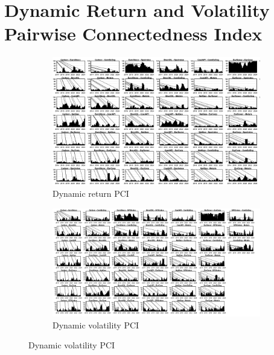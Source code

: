 \documentclass[preprint, 3p,
authoryear]{elsarticle} %
\begin{document}
\section{Dynamic Return and Volatility Pairwise Connectedness Index}
\label{appendix:c}
\begin{figure}[H]
  \caption{Dynamic Return and Volatility Pairwise Connectedness Index (Jan 2013 – Aug 2024)}
  \label{fig:dynPCIfull}
      \begin{subfigure}[H]{\textwidth}
        \centering
        \caption{Dynamic return PCI}
        \label{fig:dynretPCIfull}
        \includegraphics[width = \textwidth]{../figures/7a-AppCa-DynRetPCIfull}
      \end{subfigure}
    \bigskip
      \begin{subfigure}[H]{\textwidth}
        \centering
        \caption{Dynamic volatility PCI}
        \label{fig:dynvolPCIfull}
        \includegraphics[width = \textwidth]{../figures/7b-AppCa-DynVolPCIfull}
      \end{subfigure}
\end{figure}

\renewcommand\refname{References}

\end{document}
